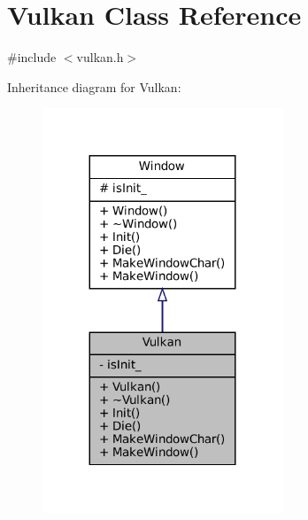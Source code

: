 \hypertarget{classVulkan}{}\section{Vulkan Class Reference}
\label{classVulkan}


{\ttfamily \#include $<$vulkan.\+h$>$}



Inheritance diagram for Vulkan\+:
\nopagebreak
\begin{figure}[H]
\begin{center}
\leavevmode
\includegraphics[width=203pt]{classVulkan__inherit__graph}
\end{center}
\end{figure}


